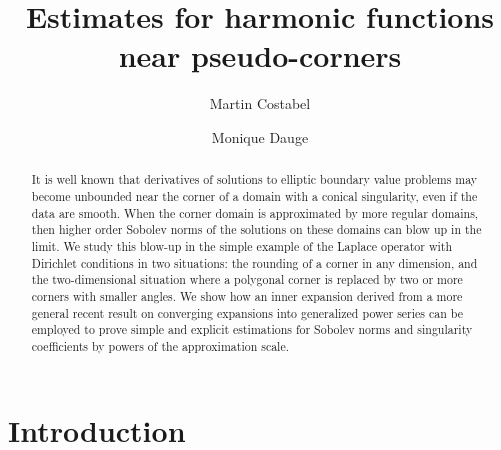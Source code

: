 \documentclass[titlepage,12pt]{amsart}
\theoremstyle{definition}
\theoremstyle{remark}
\numberwithin{equation}{section}
\begin{document}
\title{Estimates for harmonic functions near pseudo-corners}

\author{Martin Costabel}
\address{Martin Costabel: \ ORCID 0000-0003-4404-9474
(Corresponding Author)}
\address{IRMAR UMR 6625 du CNRS, Universit\'{e} de Rennes 1 }
\address{Campus de Beaulieu,
35042 Rennes Cedex, France \bigskip}

\author{Monique Dauge}
\address{Monique Dauge: \ ORCID 0000-0003-0846-9009}
\address{IRMAR UMR 6625 du CNRS, Universit\'{e} de Rennes 1 }
\address{Campus de Beaulieu,
35042 Rennes Cedex, France \bigskip}






\begin{abstract}
It is well known that derivatives of solutions to elliptic boundary value problems may become unbounded near the corner of a domain with a conical singularity, even if the data are smooth. When the corner domain is approximated by more regular domains, then higher order Sobolev norms of the solutions on these domains can blow up in the limit. We study this blow-up in the simple example of the Laplace operator with Dirichlet conditions in two situations: the rounding of a corner in any dimension, and  the two-dimensional situation where a polygonal corner is replaced by two or more corners with smaller angles. We show how an inner expansion derived from a more general recent result on converging expansions into generalized power series can be employed to prove simple and explicit estimations for Sobolev norms and singularity coefficients by powers of the approximation scale.
\end{abstract}

\maketitle

{\footnotesize
\parskip 1pt
\tableofcontents
}




\section{Introduction}
\end{document}
